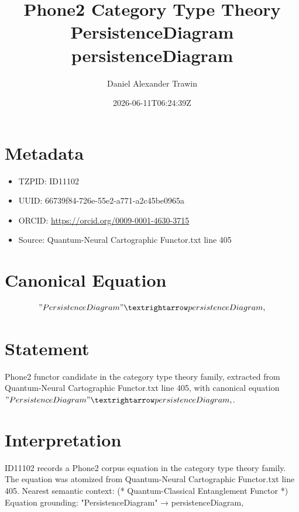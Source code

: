 \documentclass[11pt]{article}
\title{Phone2 Category Type Theory PersistenceDiagram persistenceDiagram}
\author{Daniel Alexander Trawin}
\date{2026-06-11T06:24:39Z}
\begin{document}
\maketitle
\section*{Metadata}
\begin{itemize}
\item TZPID: ID11102
\item UUID: 66739f84-726e-55e2-a771-a2c45be0965a
\item ORCID: \url{https://orcid.org/0009-0001-4630-3715}
\item Source: Quantum-Neural Cartographic Functor.txt line 405
\end{itemize}
\section*{Canonical Equation}
\[
"PersistenceDiagram" → persistenceDiagram,
\]
\section*{Statement}
Phone2 functor candidate in the category type theory family, extracted from Quantum-Neural Cartographic Functor.txt line 405, with canonical equation $"PersistenceDiagram" → persistenceDiagram,$.
\section*{Interpretation}
ID11102 records a Phone2 corpus equation in the category type theory family. The equation was atomized from Quantum-Neural Cartographic Functor.txt line 405. Nearest semantic context: (* Quantum-Classical Entanglement Functor *) Equation grounding: "PersistenceDiagram" → persistenceDiagram,
\end{document}
